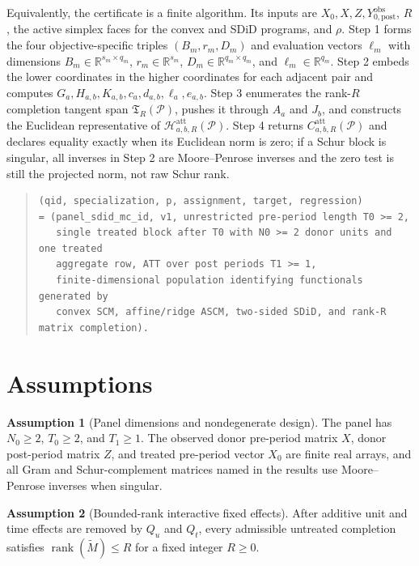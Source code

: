 \documentclass[11pt]{article}
\newcommand{\calH}{\mathcal{H}}
\newcommand{\R}{\mathbb{R}}
\theoremstyle{definition}
\newtheorem{assumption}{Assumption}
\theoremstyle{plain}
\theoremstyle{remark}
\begin{document}
Equivalently, the certificate is a finite algorithm. Its inputs are \(X_0,X,Z,Y^{\mathrm{obs}}_{0,\mathrm{post}}\), \(R\), the active simplex faces for the convex and SDiD programs, and \(\rho\). Step 1 forms the four objective-specific triples \((B_m,r_m,D_m)\) and evaluation vectors \(\ell_m\) with dimensions \(B_m\in\R^{s_m\times q_m}\), \(r_m\in\R^{s_m}\), \(D_m\in\R^{q_m\times q_m}\), and \(\ell_m\in\R^{q_m}\). Step 2 embeds the lower coordinates in the higher coordinates for each adjacent pair and computes \(G_a,H_{a,b},K_{a,b},c_a,d_{a,b},\ell_a,e_{a,b}\). Step 3 enumerates the rank-\(R\) completion tangent span \(\mathfrak T_R(\mathcal P)\), pushes it through \(A_a\) and \(J_b\), and constructs the Euclidean representative of \(\calH^{\mathrm{att}}_{a,b,R}(\mathcal P)\). Step 4 returns \(C^{\mathrm{att}}_{a,b,R}(\mathcal P)\) and declares equality exactly when its Euclidean norm is zero; if a Schur block is singular, all inverses in Step 2 are Moore--Penrose inverses and the zero test is still the projected norm, not raw Schur rank.

\begin{quote}
\begin{verbatim}
(qid, specialization, p, assignment, target, regression)
= (panel_sdid_mc_id, v1, unrestricted pre-period length T0 >= 2,
   single treated block after T0 with N0 >= 2 donor units and one treated
   aggregate row, ATT over post periods T1 >= 1,
   finite-dimensional population identifying functionals generated by
   convex SCM, affine/ridge ASCM, two-sided SDiD, and rank-R matrix completion).
\end{verbatim}
\end{quote}

\section{Assumptions}

\begin{assumption}[Panel dimensions and nondegenerate design]\label{ass:panel-dimensions}
The panel has \(N_0\ge2\), \(T_0\ge2\), and \(T_1\ge1\). The observed donor pre-period matrix \(X\), donor post-period matrix \(Z\), and treated pre-period vector \(X_0\) are finite real arrays, and all Gram and Schur-complement matrices named in the results use Moore--Penrose inverses when singular.
\end{assumption}

\begin{assumption}[Bounded-rank interactive fixed effects]\label{ass:rank-r-ife}
After additive unit and time effects are removed by \(Q_u\) and \(Q_t\), every admissible untreated completion satisfies \(\operatorname{rank}(\widetilde M)\le R\) for a fixed integer \(R\ge0\).
\end{assumption}
\end{document}
